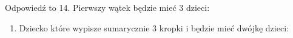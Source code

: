 Odpowiedź to 14. Pierwszy wątek będzie mieć 3 dzieci:
\begin{enumerate}
	\item Dziecko które wypisze sumarycznie 3 kropki i będzie mieć dwójkę dzieci:
\end{enumerate}